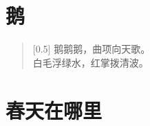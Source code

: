 \documentclass[12pt,UTF-8,openany]{ctexbook}
\begin{document}
\clearpage

\begin{center}
    
\end{center}


\hanzibox{}\hanzibox{}\hanzibox{}\hanzibox{}\hspace{1em}\hanzibox{}\hanzibox{}\hanzibox{}\hanzibox{}

\hanzibox{}\hanzibox{}\hanzibox{}\hanzibox{}\hspace{1em}




\chapter{鹅}

\begin{large}
    
    \begin{verse}[0.5\linewidth]
        \phantom{鹅}鹅鹅鹅\phantom{鹅}，曲项向天歌。 \\
        白毛浮绿水，红掌拨清波。
    \end{verse}
    
\end{large}


\clearpage

\begin{center}
    
\end{center}


\hanzibox{}\hanzibox{}\hanzibox{}\hanzibox{}\hspace{1em}\hanzibox{}\hanzibox{}\hanzibox{}\hanzibox{}

\hanzibox{}\hanzibox{}\hanzibox{}\hanzibox{}\hspace{1em}\hanzibox{}\hanzibox{}\hanzibox{}\hanzibox{}

\hanzibox{}\hanzibox{}\hanzibox{}\hanzibox{}\hspace{1em}\hanzibox{}\hanzibox{}\hanzibox{}\hanzibox{}

\hanzibox{}\hanzibox{}\hanzibox{}\hanzibox{}\hspace{1em}




\chapter{春天在哪里}
\end{document}

